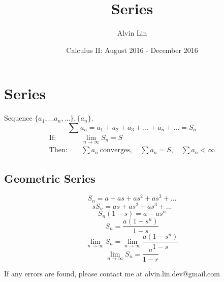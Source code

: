\documentclass[letterpaper, 12pt]{article}
\title{Series}
\author{Alvin Lin}
\date{Calculus II: August 2016 - December 2016}
\begin{document}
\maketitle

\section*{Series}
Sequence \( \bigg\{a_{1},...a_{n},...\bigg\}, \bigg\{a_{n}\bigg\} \).
\[ \sum{a_{n}} = a_{1}+a_{2}+a_{3}+...+a_{n}+... = S_{n} \]
\begin{align*}
  \mathrm{If:} & \quad \lim_{n\to\infty}{S_{n}} = S \\
  \mathrm{Then:} & \quad \sum{a_{n}} \mathrm{\ converges},
    \quad \sum{a_{n}} = S, \quad \sum{a_{n}}<\infty
\end{align*}

\subsection*{Geometric Series}
\[ S_{n} = a+as+as^{2}+as^{3}+... \]
\[ sS_{n} = as+as^{2}+as^{3}+... \]
\[ S_{n}(1-s) = a-as^{n} \]
\[ S_{n} = \frac{a(1-s^{n})}{1-s} \]
\[ \lim_{n\to\infty}{S_{n}} = \lim_{n\to\infty}{\frac{a(1-s^{n})}{1-s}} \]
\[ \lim_{n\to\infty}{S_{n}} = \frac{a}{1-r} \]

\begin{center}
  If any errors are found, please contact me at alvin.lin.dev@gmail.com
\end{center}
\end{document}
